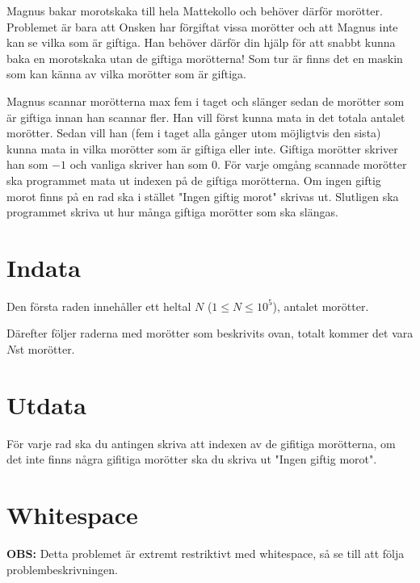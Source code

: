 Magnus bakar morotskaka till hela Mattekollo och behöver därför morötter.
Problemet är bara att Onsken har förgiftat vissa morötter och att Magnus inte kan se vilka som är giftiga.
Han behöver därför din hjälp för att snabbt kunna baka en morotskaka utan de giftiga morötterna!
Som tur är finns det en maskin som kan känna av vilka morötter som är giftiga.

Magnus scannar morötterna max fem i taget och slänger sedan de morötter som är giftiga innan han scannar fler.
Han vill först kunna mata in det totala antalet morötter.
Sedan vill han (fem i taget alla gånger utom möjligtvis den sista) kunna mata in vilka morötter som är giftiga eller inte.
Giftiga morötter skriver han som $-1$ och vanliga skriver han som $0$.
För varje omgång scannade morötter ska programmet mata ut indexen på de giftiga morötterna.
Om ingen giftig morot finns på en rad ska i stället "Ingen giftig morot"  skrivas ut.
Slutligen ska programmet skriva ut hur många giftiga morötter som ska slängas.

\section*{Indata}
Den första raden innehåller ett heltal $N$ ($1 \leq N \leq 10^5$), antalet morötter.

Därefter följer raderna med morötter som beskrivits ovan, totalt kommer det vara $N$st morötter.

\section*{Utdata}
För varje rad ska du antingen skriva att indexen av de gifitiga morötterna, om det inte finns några gifitiga morötter ska du skriva ut "Ingen giftig morot".

\section*{Whitespace}
\textbf{OBS: } Detta problemet är extremt restriktivt med whitespace, så se till att följa problembeskrivningen.